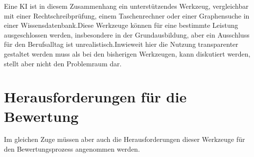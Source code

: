 \documentclass[conference]{IEEEtran}
\begin{document}
Eine KI ist in diesem Zusammenhang ein unterstützendes Werkzeug, vergleichbar mit einer Rechtschreibprüfung, einem Taschenrechner oder einer Graphensuche in einer Wissensdatenbank.Diese Werkzeuge können für eine bestimmte Leistung ausgeschlossen werden, insbesondere in der Grundausbildung, aber ein Ausschluss für den Berufsalltag ist unrealistisch.Inwieweit hier die Nutzung transparenter gestaltet werden muss als bei den bisherigen Werkzeugen, kann diskutiert werden, stellt aber nicht den Problemraum dar.

\section{Herausforderungen für die Bewertung}

Im gleichen Zuge müssen aber auch die Herausforderungen dieser Werkzeuge für den Bewertungsprozess angenommen werden.
\end{document}
